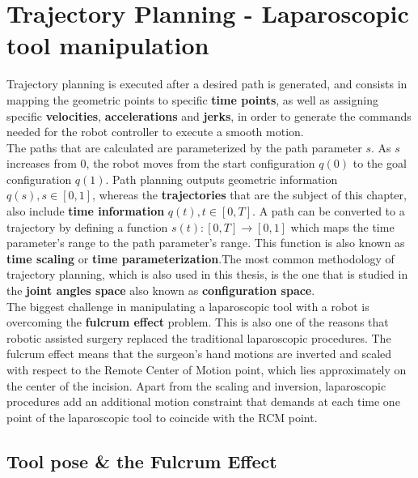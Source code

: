\chapter{Trajectory Planning - Laparoscopic tool manipulation}
\label{chapter-6}
%
Trajectory planning is executed after a desired path is generated, and consists in mapping the geometric points to specific \textbf{time points}, as well as assigning specific \textbf{velocities}, \textbf{accelerations} and \textbf{jerks}, 
in order to generate the commands needed for the robot controller to execute a smooth motion.\\

The paths that are calculated are parameterized by the path parameter $s$. As $s$ increases from $0$, the robot moves from the start configuration $q(0)$ to the goal configuration $q(1)$. 
Path planning outputs geometric information $q(s), s \in [0, 1]$, whereas the \textbf{trajectories} that are the subject of this chapter, also include \textbf{time information} $q(t), t \in [0, T]$. 
A path can be converted to a trajectory by defining a function $s(t): [0, T] \rightarrow [0, 1]$ which maps the time parameter's range to the path parameter's range. This function is also known as \textbf{time scaling} or 
\textbf{time parameterization}.The most common methodology of trajectory planning, which is also used in this thesis, is the one that is studied in the \textbf{joint angles space} also known as \textbf{configuration space}.\\

The biggest challenge in manipulating a laparoscopic tool with a robot is overcoming the \textbf{fulcrum effect} problem. This is also one of the reasons that 
robotic assisted surgery replaced the traditional laparoscopic procedures. The fulcrum effect means that the surgeon's hand motions are inverted and scaled 
with respect to the Remote Center of Motion point, which lies approximately on the center of the incision. Apart from the scaling and inversion, laparoscopic 
procedures add an additional motion constraint that demands at each time one point of the laparoscopic tool to coincide with the RCM point.\\

\section{Tool pose \& the Fulcrum Effect}
\label{section:fulcrum-effect}

